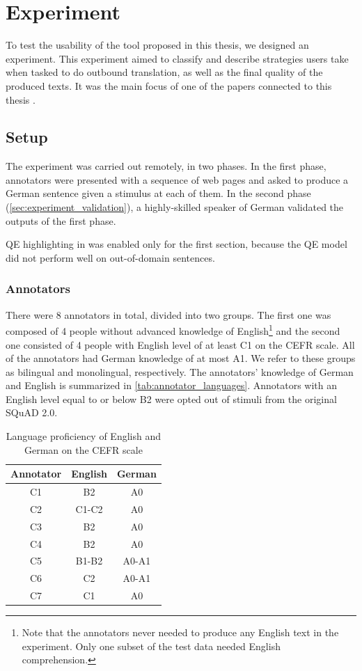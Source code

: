 \chapter{Experiment}
\label{chp:experiment}

To test the usability of the \ptakopet{} tool proposed in this thesis, we designed an experiment. This experiment aimed to classify and describe strategies users take when tasked to do outbound translation, as well as the final quality of the produced texts. It was the main focus of one of the papers connected to this thesis \citep{zouhar:ptakopet}.

\section{Setup}

The experiment was carried out remotely, in two phases. In the first phase, annotators were presented with a sequence of web pages and asked to produce a German sentence given a stimulus at each of them. In the second phase (\cref{sec:experiment_validation}), a highly-skilled speaker of German validated the outputs of the first phase.

QE highlighting in \ptakopet{} was enabled only for the first section, because the QE model did not perform well on out-of-domain sentences.

\subsection{Annotators}

There were 8 annotators in total, divided into two groups. The first one was composed of 4 people without advanced knowledge of English\footnote{Note that the annotators never needed to produce any English text in the experiment. Only one subset of the test data needed English comprehension.} and the second one consisted of 4 people with English level of at least C1 on the CEFR scale. All of the annotators had German knowledge of at most A1. We refer to these groups as bilingual and monolingual, respectively. The annotators' knowledge of German and English is summarized in \autoref{tab:annotator_languages}. Annotators with an English level equal to or below B2 were opted out of stimuli from the original SQuAD 2.0.

\begin{table}[H]
    \centering
    \begin{tabular}{| c c c |}
        \hline
        Annotator& English & German \\
        \hline
        C1& B2    & A0 \\
        C2& C1-C2 & A0 \\
        C3& B2    & A0 \\
        C4& B2    & A0 \\
        C5& B1-B2 & A0-A1 \\
        C6& C2    & A0-A1 \\
        C7& C1    & A0 \\
        \hline
    \end{tabular}
    \caption{\label{tab:annotator_languages} Language proficiency of English and German on the CEFR scale}
\end{table}

